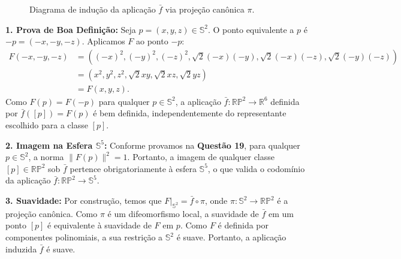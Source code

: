 {\begin{figure}[htbp]
\begin{tikzpicture}[scale=1.2, line join=round, line cap=round]
		\end{tikzpicture}
		\caption{Diagrama de indução da aplicação $\bar{f}$ via projeção canônica $\pi$.}
	\end{figure}
	\textbf{1. Prova de Boa Definição:}
	Seja $p = (x, y, z) \in \mathbb{S}^2$. O ponto equivalente a $p$ é $-p = (-x, -y, -z)$. Aplicamos $F$ ao ponto $-p$:
	\begin{align*}
		F(-x, -y, -z) &= ((-x)^2, (-y)^2, (-z)^2, \sqrt{2}(-x)(-y), \sqrt{2}(-x)(-z), \sqrt{2}(-y)(-z)) \\
		&= (x^2, y^2, z^2, \sqrt{2}xy, \sqrt{2}xz, \sqrt{2}yz) \\
		&= F(x, y, z).
	\end{align*}
	Como $F(p) = F(-p)$ para qualquer $p \in \mathbb{S}^2$, a aplicação $\bar{f} : \mathbb{RP}^2 \to \mathbb{R}^6$ definida por $\bar{f}([p]) = F(p)$ é bem definida, independentemente do representante escolhido para a classe $[p]$.
	
	\textbf{2. Imagem na Esfera $\mathbb{S}^5$:}
	Conforme provamos na \textbf{Questão 19}, para qualquer $p \in \mathbb{S}^2$, a norma $\|F(p)\|^2 = 1$. Portanto, a imagem de qualquer classe $[p] \in \mathbb{RP}^2$ sob $\bar{f}$ pertence obrigatoriamente à esfera $\mathbb{S}^5$, o que valida o codomínio da aplicação $\bar{f} : \mathbb{RP}^2 \to \mathbb{S}^5$.
	
	\textbf{3. Suavidade:}
	Por construção, temos que $F|_{\mathbb{S}^2} = \bar{f} \circ \pi$, onde $\pi : \mathbb{S}^2 \to \mathbb{RP}^2$ é a projeção canônica. Como $\pi$ é um difeomorfismo local, a suavidade de $\bar{f}$ em um ponto $[p]$ é equivalente à suavidade de $F$ em $p$. Como $F$ é definida por componentes polinomiais, a sua restrição a $\mathbb{S}^2$ é suave. Portanto, a aplicação induzida $\bar{f}$ é suave.
}
